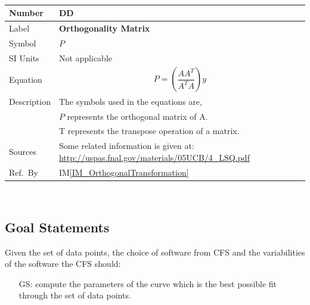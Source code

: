 \documentclass[12pt]{article}
\newcommand{\colAwidth}{0.13\textwidth}
\newcommand{\colBwidth}{0.82\textwidth}
\newcounter{defnum} %
\newcounter{datadefnum} %
\newcounter{goalnum} %
\newcommand{\iref}[1]{IM\ref{#1}}
\newcommand{\famname}{CFS} %
\begin{document}
~\newline
\noindent
\begin{minipage}{\textwidth}
	\renewcommand*{\arraystretch}{1.5}
	\begin{tabular}{| p{\colAwidth} | p{\colBwidth}|}
		\hline
		\rowcolor[gray]{0.9}
		Number
		& DD{datadefnum}\thedatadefnum \label{DD_OrthogonalityMatrix}\\
		\hline
		
		Label
		& \bf Orthogonality Matrix\\
		\hline
		
		Symbol 
		&$P$\\
		\hline
		
		SI Units 
		& Not applicable\\
		\hline
		
		Equation
		&\begin{equation*}
		P =  (\frac{A A^{T}}{A^{T} A} )  y
		\end{equation*}\\
		\hline
		
		Description 
		&The symbols used in the equations are,\\ 
		& $P$ represents the orthogonal matrix of A.\\
		& T represents the transpose operation of a matrix.\\
		
		\hline
		
		Sources
		& Some related information is given at: \url{http://uspas.fnal.gov/materials/05UCB/4_LSQ.pdf}\\
		\hline
		
		Ref.\ By 
		& \iref{IM_OrthogonalTransformation}\\
		\hline
		
	\end{tabular}
\end{minipage}\\



\subsection{Goal Statements}\label{Goals}

\noindent Given the set of data points, the choice of software from \famname{} and the variabilities of the software the \famname{} should:

\begin{itemize}

\item[GS\refstepcounter{goalnum}\thegoalnum \label{G_bestfit}:] compute the parameters of the curve which is the best possible fit through the set of data points.

\end{itemize}
\end{document}

